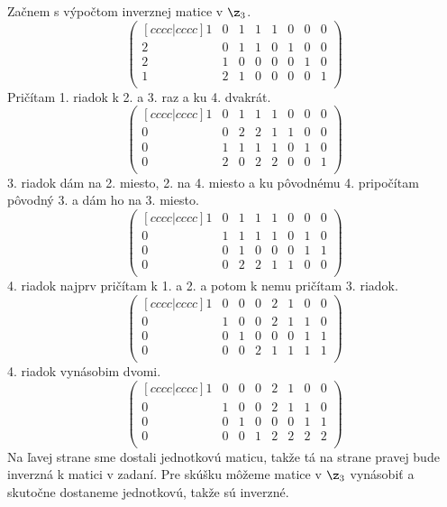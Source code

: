 
Začnem s výpočtom inverznej matice v $\z_3$.
\[\begin{pmatrix}[cccc|cccc]
    1 & 0 & 1 & 1 & 1 & 0 & 0 & 0 \\
    2 & 0 & 1 & 1 & 0 & 1 & 0 & 0 \\
    2 & 1 & 0 & 0 & 0 & 0 & 1 & 0 \\
    1 & 2 & 1 & 0 & 0 & 0 & 0 & 1 \\
   \end{pmatrix}\]
Pričítam 1. riadok k 2. a 3. raz a ku 4. dvakrát.
\[\begin{pmatrix}[cccc|cccc]
    1 & 0 & 1 & 1 & 1 & 0 & 0 & 0 \\
    0 & 0 & 2 & 2 & 1 & 1 & 0 & 0 \\
    0 & 1 & 1 & 1 & 1 & 0 & 1 & 0 \\
    0 & 2 & 0 & 2 & 2 & 0 & 0 & 1 \\
   \end{pmatrix}\]
3. riadok dám na 2. miesto, 2. na 4. miesto a ku pôvodnému 4. 
pripočítam pôvodný 3. a dám ho na 3. miesto.
\[\begin{pmatrix}[cccc|cccc]
    1 & 0 & 1 & 1 & 1 & 0 & 0 & 0 \\
    0 & 1 & 1 & 1 & 1 & 0 & 1 & 0 \\
    0 & 0 & 1 & 0 & 0 & 0 & 1 & 1 \\
    0 & 0 & 2 & 2 & 1 & 1 & 0 & 0 \\
   \end{pmatrix}\]
4. riadok najprv pričítam k 1. a 2. a potom k nemu pričítam 3. riadok.
\[\begin{pmatrix}[cccc|cccc]
    1 & 0 & 0 & 0 & 2 & 1 & 0 & 0 \\
    0 & 1 & 0 & 0 & 2 & 1 & 1 & 0 \\
    0 & 0 & 1 & 0 & 0 & 0 & 1 & 1 \\
    0 & 0 & 0 & 2 & 1 & 1 & 1 & 1 \\
   \end{pmatrix}\]
4. riadok vynásobim dvomi.
\[\begin{pmatrix}[cccc|cccc]
    1 & 0 & 0 & 0 & 2 & 1 & 0 & 0 \\
    0 & 1 & 0 & 0 & 2 & 1 & 1 & 0 \\
    0 & 0 & 1 & 0 & 0 & 0 & 1 & 1 \\
    0 & 0 & 0 & 1 & 2 & 2 & 2 & 2 \\
   \end{pmatrix}\]
Na ľavej strane sme dostali jednotkovú maticu, takže tá na strane 
pravej bude inverzná k matici v zadaní. Pre skúšku môžeme matice 
v $\z_3$ vynásobiť a skutočne dostaneme jednotkovú, takže sú inverzné.

